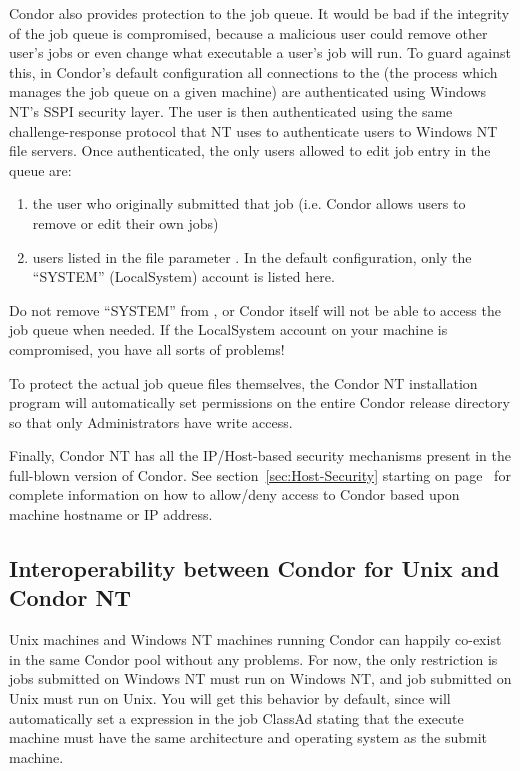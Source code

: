 Condor also provides protection to the job queue.  It would be bad if the
integrity of the job queue is compromised, because a malicious user could
remove other user's jobs or even change what executable a user's job will
run.  To guard against this, in Condor's default configuration all connections to the  (the
process which manages the job queue on a given machine) are authenticated
using Windows NT's SSPI security layer.  The user is then authenticated
using the same challenge-response protocol that NT uses to authenticate
users to Windows NT file servers.  Once authenticated, the only users
allowed to edit job entry in the queue are:
\begin{enumerate}
\item the user who originally submitted that job (i.e. Condor allows users
to remove or edit their own jobs)
\item users listed in the  file parameter
.  In the default configuration, only the
``SYSTEM'' (LocalSystem) account is listed here.  
\end{enumerate}
\Warn Do not remove ``SYSTEM'' from , or
Condor itself will not be able to access the job queue when needed.  If the
LocalSystem account on your machine is compromised, you have all sorts of
problems!

To protect the actual job queue files themselves, the Condor NT installation
program will automatically set permissions on the entire Condor release
directory so that only Administrators have write access.

Finally, Condor NT has all the IP/Host-based security mechanisms present
in the full-blown version of Condor.  See section~\ref{sec:Host-Security}
starting on page~\pageref{sec:Host-Security} for complete information
on how to allow/deny access to Condor based upon machine hostname or
IP address.

\subsection{Interoperability between Condor for Unix and Condor NT}

Unix machines and Windows NT machines running Condor can happily
co-exist in the same Condor pool without any problems.  For now, the
only restriction is jobs submitted on Windows NT must run on Windows
NT, and job submitted on Unix must run on Unix.  You will get this
behavior by default, since  will automatically set a
 expression in the job ClassAd stating that the
execute machine must have the same architecture and operating system as
the submit machine.

